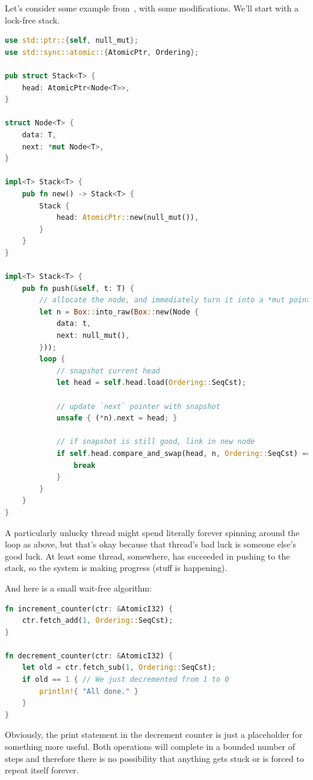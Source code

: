 \documentclass[a4paper]{report}
\begin{document}
Let's consider some example from~\cite{lockfreedom}, with some modifications. We'll start with a lock-free stack.
\begin{lstlisting}[language=Rust]
use std::ptr::{self, null_mut};
use std::sync::atomic::{AtomicPtr, Ordering};

pub struct Stack<T> {
    head: AtomicPtr<Node<T>>,
}

struct Node<T> {
    data: T,
    next: *mut Node<T>,
}

impl<T> Stack<T> {
    pub fn new() -> Stack<T> {
        Stack {
            head: AtomicPtr::new(null_mut()),
        }
    }
}

impl<T> Stack<T> {
    pub fn push(&self, t: T) {
        // allocate the node, and immediately turn it into a *mut pointer
        let n = Box::into_raw(Box::new(Node {
            data: t,
            next: null_mut(),
        }));
        loop {
            // snapshot current head
            let head = self.head.load(Ordering::SeqCst);

            // update `next` pointer with snapshot
            unsafe { (*n).next = head; }

            // if snapshot is still good, link in new node
            if self.head.compare_and_swap(head, n, Ordering::SeqCst) == head {
                break
            }
        }
    }
}
\end{lstlisting}

A particularly unlucky thread might spend literally forever spinning around the loop as above, but that's okay because that thread's bad luck is someone else's good luck. At least some thread, somewhere, has succeeded in pushing to the stack, so the system is making progress (stuff is happening). 

And here is a small wait-free algorithm:

\begin{lstlisting}[language=Rust]
fn increment_counter(ctr: &AtomicI32) {
    ctr.fetch_add(1, Ordering::SeqCst);
}

fn decrement_counter(ctr: &AtomicI32) {
    let old = ctr.fetch_sub(1, Ordering::SeqCst);
    if old == 1 { // We just decremented from 1 to 0
        println!{ "All done." }
    }
}
\end{lstlisting}

Obviously, the print statement in the decrement counter is just a placeholder for something more useful. Both operations will complete in a bounded number of steps and therefore there is no possibility that anything gets stuck or is forced to repeat itself forever. 
\end{document}
